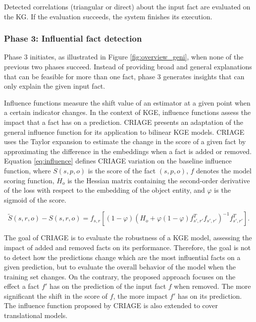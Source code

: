 Detected correlations (triangular or direct) about the input fact are evaluated on the KG. If the evaluation succeeds, the system finishes its execution. 

\subsubsection*{Phase 3: Influential fact detection}
Phase 3 initiates, as illustrated in Figure \ref{fig:overview_geni}, when none of the previous two phases succeed. Instead of providing broad and general explanations that can be feasible for more than one fact, phase 3 generates insights that can only explain the given input fact. 

Influence functions measure the shift value of an estimator at a given point when a certain indicator changes. In the context of KGE, influence functions assess the impact that a fact has on a prediction. CRIAGE \citep{criage} presents an adaptation of the general influence function for its application to bilinear KGE models. CRIAGE uses the Taylor expansion to estimate the change in the score of a given fact by approximating the difference in the embeddings when a fact is added or removed. Equation \ref{eq:influence} defines CRIAGE variation on the baseline influence function, where $S(s,p,o)$ is the score of the fact $(s,p,o)$, $f$ denotes the model scoring function, $H_o$ is the Hessian matrix containing the second-order derivative of the loss with respect to the embedding of the object entity, and $\varphi$ is the sigmoid of the score.

\begin{equation}\label{eq:influence}
   \widetilde{S}(s,r,o)-S(s,r,o) = f_{s,r}[(1-\varphi){(H_o+\varphi(1-\varphi)f_{s',r'}^{T}f_{s',r'})}^{-1}f_{s',r'}^{T}].
\end{equation}

The goal of CRIAGE is to evaluate the robustness of a KGE model, assessing the impact of added and removed facts on its performance. Therefore, the goal is not to detect how the predictions change which are the most influential facts on a given prediction, but to evaluate the overall behavior of the model when the training set changes. On the contrary, the proposed approach focuses on the effect a fact $f'$ has on the prediction of the input fact $f$ when removed. The more significant the shift in the score of $f$, the more impact $f'$ has on its prediction. The influence function proposed by CRIAGE is also extended to cover translational models.

